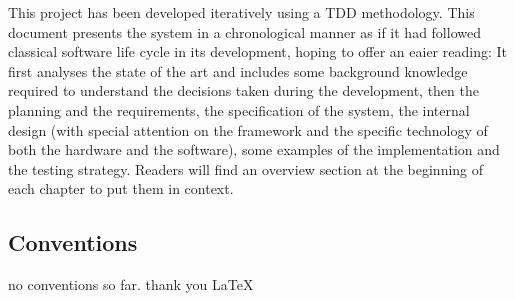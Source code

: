 This project has been developed iteratively using a \ac{TDD} methodology. 
This document presents the system in a chronological manner as if it had followed classical software life cycle in its development, hoping to offer an eaier reading:
It first analyses the state of the art and includes some background knowledge required to understand the decisions taken during the development, then the planning and the requirements, the specification of the system, the internal design (with special attention on the framework and the specific technology of both the hardware and the software), some examples of the implementation and the testing strategy.
Readers will find an overview section at the beginning of each chapter to put them in context.

\subsection{Conventions}
no conventions so far. thank you \LaTeX
